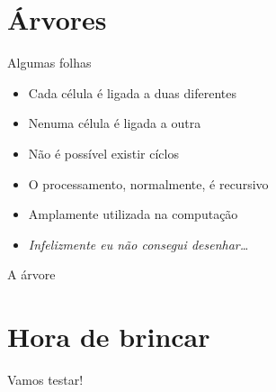 \documentclass[14pt]{beamer}
\begin{document}
	\section{Árvores}
		\begin{frame}{Algumas folhas}
			\begin{itemize}
				\presentationPause\item Cada célula é ligada a duas diferentes
				\presentationPause\item Nenuma célula é ligada a outra
				\presentationPause\item Não é possível existir cíclos
				\presentationPause\item O processamento, normalmente, é recursivo
				\presentationPause\item Amplamente utilizada na computação
				\presentationPause\item \emph{Infelizmente eu não consegui desenhar\dots}
			\end{itemize}
		\end{frame}

		\begin{frame}{A árvore}
			\begin{figure}[H]
				\centering
				
				\label{fig.tree}
			\end{figure}
		\end{frame}

	\section{Hora de brincar}
		\begin{frame}
			\begin{center}\Huge
				Vamos testar!
			\end{center}
		\end{frame}
	
\end{document}
